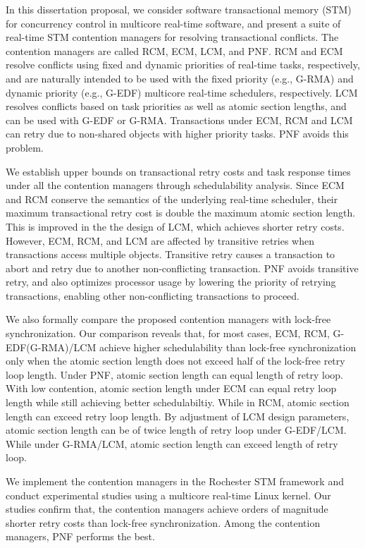 \documentclass[12pt,english]{report}
\begin{document}
In this dissertation proposal, we consider software transactional memory (STM) for concurrency control in multicore real-time software, and present a suite of real-time STM contention managers for resolving transactional conflicts. The contention managers are called RCM, ECM, LCM, and PNF. RCM and ECM resolve conflicts using fixed and dynamic priorities of real-time tasks, respectively, and are naturally intended to be used with the fixed priority (e.g., G-RMA) and dynamic priority (e.g., G-EDF) multicore real-time schedulers, respectively. LCM resolves conflicts based on task priorities as well as atomic section lengths, and can be used with G-EDF or G-RMA.
 Transactions under ECM, RCM and LCM can retry due to non-shared objects with higher priority tasks. PNF avoids this problem.

We establish upper bounds on transactional retry costs and task response times under all the contention managers through schedulability analysis. Since ECM and RCM conserve the semantics of the underlying real-time scheduler, their maximum transactional retry cost is double the maximum atomic section length. This is improved in the the design of LCM, which achieves  shorter retry costs.  However, ECM, RCM, and LCM are affected by transitive retries when transactions access multiple objects. 
Transitive retry causes a transaction to abort and retry due to another non-conflicting transaction.  
PNF avoids transitive retry, and also optimizes processor usage by lowering the priority of retrying transactions, enabling other non-conflicting transactions to proceed. 

We also formally compare the proposed contention managers with lock-free synchronization. 
Our comparison reveals that, for most cases, ECM, RCM, G-EDF(G-RMA)/LCM achieve higher schedulability than lock-free synchronization only when the atomic section length does not exceed half of the lock-free retry loop length. Under PNF, atomic section length can equal length of retry loop.
 With low contention, atomic section length under ECM can equal retry loop length while still achieving better schedulabiltiy. While in RCM, atomic section length can exceed retry loop length. By adjustment of LCM design parameters, atomic section length can be of twice length of retry loop under G-EDF/LCM. While under G-RMA/LCM, atomic section length can exceed length of retry loop.

We implement the contention managers in the Rochester STM framework and conduct experimental studies using a multicore real-time Linux kernel. Our studies confirm that, the contention managers achieve orders of magnitude shorter retry costs than lock-free synchronization. Among the contention managers, PNF performs the best.
\end{document}

